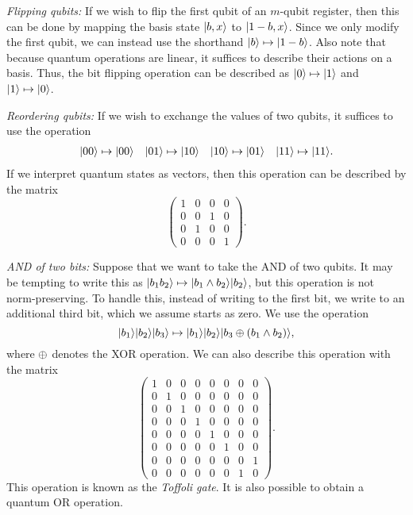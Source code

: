 \documentclass[12pt]{article}
\begin{document}
\begin{adjustwidth}{0.25in}{0in}
  \emph{Flipping qubits:} If we wish to flip the first qubit of an $m$-qubit
  register, then this can be done by mapping the basis state $\reg*{b, x}$ to
  $\reg*{1-b, x}$. Since we only modify the first qubit, we can instead use the
  shorthand $\reg*{b} \mapsto \reg*{1-b}$. Also note that because quantum
  operations are linear, it suffices to describe their actions on a basis. Thus,
  the bit flipping operation can be described as $\qz \mapsto \qo$ and $\qo
  \mapsto \qz$. \vspace{0.5\baselineskip}

  \noindent \emph{Reordering qubits:} If we wish to exchange the values of two
  qubits, it suffices to use the operation
  \begin{align*}
    \reg*{00} \mapsto \reg*{00} &&
    \reg*{01} \mapsto \reg*{10} &&
    \reg*{10} \mapsto \reg*{01} &&
    \reg*{11} \mapsto \reg*{11}.
  \end{align*}
  If we interpret quantum states as vectors, then this operation can be
  described by the matrix
  $$
    \begin{pmatrix}
      1 & 0 & 0 & 0 \\
      0 & 0 & 1 & 0 \\
      0 & 1 & 0 & 0 \\
      0 & 0 & 0 & 1
    \end{pmatrix}.
  $$ \vspace{0.5\baselineskip}

  \noindent \emph{AND of two bits:} Suppose that we want to take the AND of two
  qubits. It may be tempting to write this as $\reg*{b_1b_2} \mapsto \reg*{b_1
  \land b_2}\reg*{b_2}$, but this operation is not norm-preserving. To handle
  this, instead of writing to the first bit, we write to an additional third
  bit, which we assume starts as zero. We use the operation
  $$
    \reg*{b_1}\reg*{b_2}\reg*{b_3} \mapsto \reg*{b_1}\reg*{b_2}\reg*{b_3 \xor
    (b_1 \land b_2)},
  $$
  where $\xor$ denotes the XOR operation. We can also describe this operation
  with the matrix
  $$
    \begin{pmatrix}
      1 & 0 & 0 & 0 & 0 & 0 & 0 & 0 \\
      0 & 1 & 0 & 0 & 0 & 0 & 0 & 0 \\
      0 & 0 & 1 & 0 & 0 & 0 & 0 & 0 \\
      0 & 0 & 0 & 1 & 0 & 0 & 0 & 0 \\
      0 & 0 & 0 & 0 & 1 & 0 & 0 & 0 \\
      0 & 0 & 0 & 0 & 0 & 1 & 0 & 0 \\
      0 & 0 & 0 & 0 & 0 & 0 & 0 & 1 \\
      0 & 0 & 0 & 0 & 0 & 0 & 1 & 0
    \end{pmatrix}.
  $$
  This operation is known as the \emph{Toffoli gate}. It is also possible to
  obtain a quantum OR operation. \vspace{0.5\baselineskip}


\end{adjustwidth}
\end{document}
